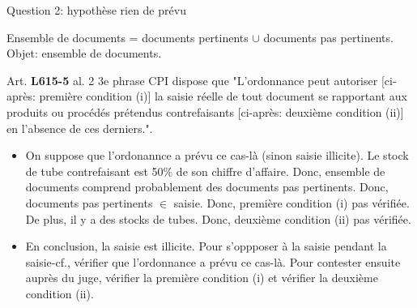 \begin{frame}{Question 2: hypothèse rien de prévu}

Ensemble de documents = documents pertinents $\cup$ documents pas pertinents.\\
Objet: ensemble de documents.

\begin{block}{}
Art. \textbf{L615-5} al. 2 3e phrase CPI dispose que "L'ordonnance peut autoriser 
[ci-après: première condition (i)] la saisie réelle de tout document se rapportant aux produits ou procédés prétendus contrefaisants
[ci-après: deuxième condition (ii)] en l'absence de ces derniers.".
\end{block}

\begin{itemize}
    \item On suppose que l'ordonannce a prévu ce cas-là (sinon 
    saisie illicite). Le stock de tube
        contrefaisant est 50\% de son chiffre d'affaire.
        Donc, ensemble de documents comprend probablement
        des documents pas pertinents. Donc,
        documents pas pertinents $\in$ saisie.
        Donc, première condition (i) pas vérifiée.
        De plus, il y a des stocks de tubes.
        Donc, deuxième condition (ii) pas vérifiée.

    \item En conclusion, la saisie est illicite.
    Pour s'oppposer à la saisie pendant la saisie-cf., 
    vérifier que l'ordonnance a prévu ce cas-là.
    Pour contester ensuite auprès du juge,
    vérifier la première condition (i)
    et vérifier la deuxième condition (ii).
\end{itemize}

\end{frame}



